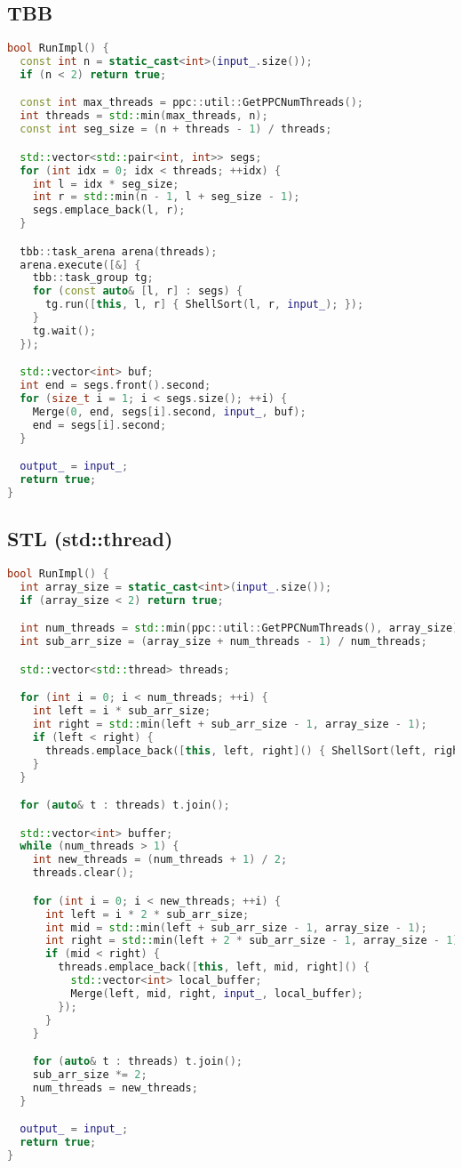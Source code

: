 \documentclass[a4paper,12pt]{article}
\begin{document}
\subsection{TBB}
\begin{lstlisting}[language=C++]
bool RunImpl() {
  const int n = static_cast<int>(input_.size());
  if (n < 2) return true;

  const int max_threads = ppc::util::GetPPCNumThreads();
  int threads = std::min(max_threads, n);
  const int seg_size = (n + threads - 1) / threads;

  std::vector<std::pair<int, int>> segs;
  for (int idx = 0; idx < threads; ++idx) {
    int l = idx * seg_size;
    int r = std::min(n - 1, l + seg_size - 1);
    segs.emplace_back(l, r);
  }

  tbb::task_arena arena(threads);
  arena.execute([&] {
    tbb::task_group tg;
    for (const auto& [l, r] : segs) {
      tg.run([this, l, r] { ShellSort(l, r, input_); });
    }
    tg.wait();
  });

  std::vector<int> buf;
  int end = segs.front().second;
  for (size_t i = 1; i < segs.size(); ++i) {
    Merge(0, end, segs[i].second, input_, buf);
    end = segs[i].second;
  }

  output_ = input_;
  return true;
}
\end{lstlisting}

\subsection{STL (std::thread)}
\begin{lstlisting}[language=C++]
bool RunImpl() {
  int array_size = static_cast<int>(input_.size());
  if (array_size < 2) return true;

  int num_threads = std::min(ppc::util::GetPPCNumThreads(), array_size);
  int sub_arr_size = (array_size + num_threads - 1) / num_threads;

  std::vector<std::thread> threads;

  for (int i = 0; i < num_threads; ++i) {
    int left = i * sub_arr_size;
    int right = std::min(left + sub_arr_size - 1, array_size - 1);
    if (left < right) {
      threads.emplace_back([this, left, right]() { ShellSort(left, right, input_); });
    }
  }

  for (auto& t : threads) t.join();

  std::vector<int> buffer;
  while (num_threads > 1) {
    int new_threads = (num_threads + 1) / 2;
    threads.clear();

    for (int i = 0; i < new_threads; ++i) {
      int left = i * 2 * sub_arr_size;
      int mid = std::min(left + sub_arr_size - 1, array_size - 1);
      int right = std::min(left + 2 * sub_arr_size - 1, array_size - 1);
      if (mid < right) {
        threads.emplace_back([this, left, mid, right]() {
          std::vector<int> local_buffer;
          Merge(left, mid, right, input_, local_buffer);
        });
      }
    }

    for (auto& t : threads) t.join();
    sub_arr_size *= 2;
    num_threads = new_threads;
  }

  output_ = input_;
  return true;
}
\end{lstlisting}
\end{document}
